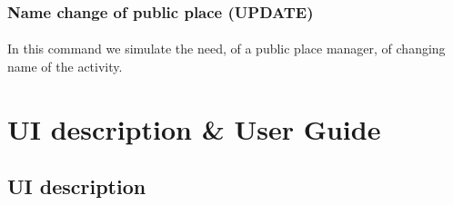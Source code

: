 \documentclass[a4paper,12pt]{article}
\begin{document}
\subsubsection{Name change of public place (UPDATE)}
\paragraph{} In this command we simulate the need, of a public place manager, of changing name of the activity.
\begin{center}
\end{center}
\clearpage
\section{UI description \& User Guide}
\subsection{UI description}
\end{document}

